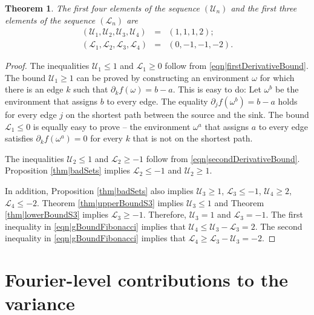 \documentclass[reqno]{amsart}
\newtheorem{theorem}{Theorem}[section]
\begin{document}
 
\begin{theorem} The first four elements of the sequence $\left(\mathcal U_n\right)$ and the first three elements of the sequence $\left(\mathcal L_n\right)$ are 
\begin{eqnarray}
\left(\mathcal U_1,\mathcal U_2, \mathcal U_3, \mathcal U_4\right)&=&(1,1,1,2);
\label{eqn|UFirstElements}\\
\left(\mathcal L_1,\mathcal L_2, \mathcal L_3,\mathcal L_4\right)&=&(0,-1,-1,-2).
\label{eqn|LFirstElements}
\end{eqnarray} \end{theorem}
\begin{proof} The inequalities $\mathcal U_1\leq 1$ and $\mathcal L_1\geq 0$ follow from \eqref{eqn|firstDerivativeBound}. The bound $\mathcal U_1\geq 1$ 
can be proved by constructing an environment $\omega$ for which there is an edge $k$ such that $\partial_kf(\omega)=b-a$. This is easy to do: Let $\omega^b$ be the environment that assigns $b$ to every edge. The equality $\partial_jf(\omega^b)=b-a$ holds for every edge $j$ on the shortest path between the source and the sink. The bound $\mathcal L_1\leq 0$ 
is equally easy to prove -- the environment $\omega^a$ that assigns $a$ to every edge satisfies $\partial_kf(\omega^a)=0$ for every $k$ that is not on the shortest path.  

The inequalities $\mathcal U_2\leq 1$ and $\mathcal L_2\geq -1$ follow from \eqref{eqn|secondDerivativeBound}. Proposition \ref{thm|badSets} implies $\mathcal L_2\leq -1$ and $\mathcal U_2\geq 1$. 

In addition, Proposition \ref{thm|badSets} also implies $\mathcal U_3\geq 1$, $\mathcal L_3\leq -1$,  $\mathcal U_4\geq 2$, $\mathcal L_4\leq -2$. 
Theorem \ref{thm|upperBoundS3} implies $\mathcal U_3\leq 1$ and Theorem \ref{thm|lowerBoundS3} implies $\mathcal L_3\geq -1$. Therefore, 
$\mathcal U_3=1$ and $\mathcal L_3=-1$. 
The first inequality in \eqref{eqn|gBoundFibonacci} implies that $
\mathcal U_4\leq \mathcal U_3-\mathcal L_3=2$.  The second inequality in \eqref{eqn|gBoundFibonacci} implies that $
\mathcal L_4\geq \mathcal L_3-\mathcal U_3=-2$. 
\end{proof}
 


   
 
 
   
   
   
 
\section{Fourier-level contributions to the variance} \label{sec|HigherOrderInfluential}
 
\end{document}
